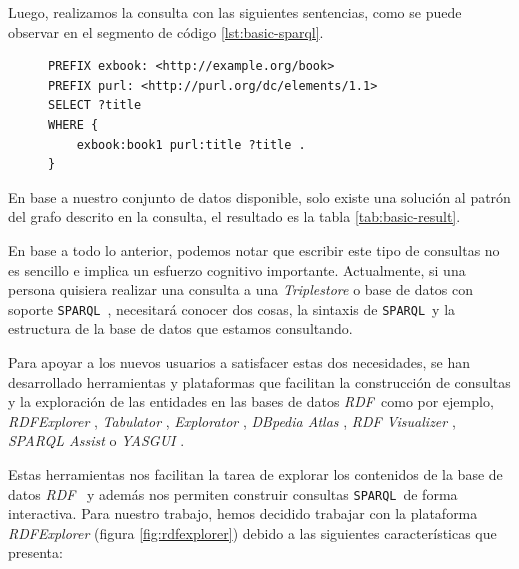 \documentclass[conference,compsoc]{IEEEtran}
\newcommand{\rdf}{\textit{RDF}\ }
\newcommand{\spql}{\texttt{SPARQL}\ }
\begin{document}
Luego, realizamos la consulta con las siguientes sentencias, como se puede observar en
el segmento de código \ref{lst:basic-sparql}.

\begin{figure}
    \begin{lstlisting}[captionpos=b, caption=Consulta SPARQL basica., label=lst:basic-sparql, basicstyle=\ttfamily,frame=single]
PREFIX exbook: <http://example.org/book>
PREFIX purl: <http://purl.org/dc/elements/1.1>
SELECT ?title
WHERE {
    exbook:book1 purl:title ?title .
}
     \end{lstlisting}
\end{figure}

En base a nuestro conjunto de datos disponible, solo existe una
solución al patrón del grafo descrito en la consulta, el resultado es la tabla \ref{tab:basic-result}.

\begin{table}[h]
    \label{tab:basic-result}
    \caption{Resultado de una consulta SPARQL básica}
    \centering
\end{table}

En base a todo lo anterior, podemos notar que escribir este tipo de consultas no es
sencillo e implica un esfuerzo cognitivo importante. Actualmente, si una persona
quisiera realizar una consulta a una \textit{Triplestore} o base de datos con soporte \spql, necesitará
conocer dos cosas, la sintaxis de \spql y la estructura de la base de datos que estamos
consultando.

Para apoyar a los nuevos usuarios a satisfacer estas dos necesidades, se han desarrollado
herramientas y plataformas que facilitan la construcción de consultas y la exploración
de las entidades en las bases de datos \rdf como por ejemplo, \textit{RDFExplorer}
\cite{vargas2019rdf}, \textit{Tabulator} \cite{berners2006tabulator} , \textit{Explorator}
\cite{araujo2009experimenting}, \textit{DBpedia Atlas} \cite{valsecchi2015dbpedia},
\textit{RDF Visualizer} \cite{sayers2004node}, \textit{SPARQL Assist}
\cite{mccarthy2012sparql} o \textit{YASGUI} \cite{rietveld2017yasgui}.

Estas herramientas nos facilitan la tarea de explorar los contenidos de la base de datos \rdf
y además nos permiten construir consultas \spql de forma interactiva. Para nuestro trabajo,
hemos decidido trabajar con la plataforma \textit{RDFExplorer} (figura \ref{fig:rdfexplorer}) debido a las siguientes
características que presenta:
\end{document}

